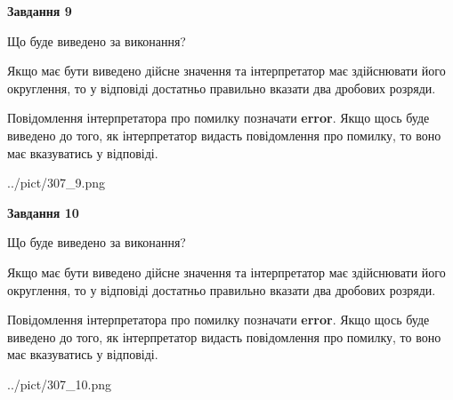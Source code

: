 \documentclass[12pt, ukrainian]{article}
\begin{document}
{\begin {Large}
{\begin {center}\textbf{Завдання 9}\end {center}}\par
Що буде виведено за виконання? \par

Якщо має бути виведено дійсне значення та інтерпретатор має здійснювати його округлення, 
то у відповіді достатньо правильно вказати два дробових розряди.

Повідомлення інтерпретатора про помилку позначати \textbf{error}.
Якщо щось буде виведено до того, як інтерпретатор видасть повідомлення про помилку, 
то воно має вказуватись у відповіді. \par

\begin{center}
	{../pict/307_9.png}
\end{center}
\newpage

{\begin {center}\textbf{Завдання 10}\end {center}}\par
Що буде виведено за виконання? \par

Якщо має бути виведено дійсне значення та інтерпретатор має здійснювати його округлення, 
то у відповіді достатньо правильно вказати два дробових розряди.

Повідомлення інтерпретатора про помилку позначати \textbf{error}.
Якщо щось буде виведено до того, як інтерпретатор видасть повідомлення про помилку, 
то воно має вказуватись у відповіді. \par

\begin{center}
	{../pict/307_10.png}
\end{center}
\newpage

\end {Large}}
\end{document}
